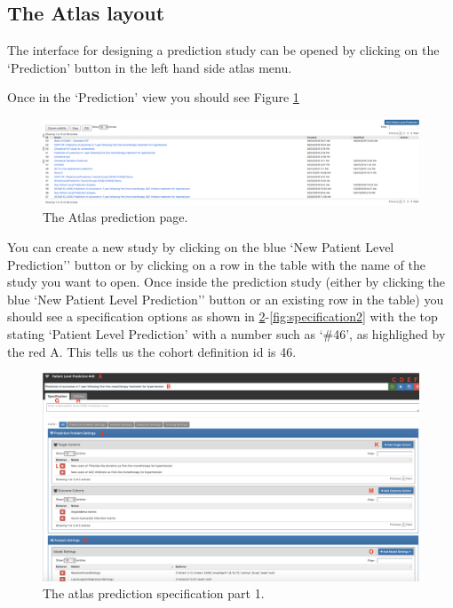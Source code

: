 \documentclass[11pt]{book}
\theoremstyle{definition}
\theoremstyle{definition}
\theoremstyle{definition}
\theoremstyle{remark}
\begin{document}
\hypertarget{the-atlas-layout}{%
\subsection{The Atlas layout}\label{the-atlas-layout}}

The interface for designing a prediction study can be opened by clicking on the `Prediction' button in the left hand side atlas menu.

Once in the `Prediction' view you should see Figure \ref{fig:figure2b}

\begin{figure}
\includegraphics[width=1\linewidth]{images/PatientLevelPrediction/atlasImplementation/prediction_page} \caption{The Atlas prediction page.}\label{fig:figure2b}
\end{figure}

You can create a new study by clicking on the blue `New Patient Level Prediction'' button or by clicking on a row in the table with the name of the study you want to open. Once inside the prediction study (either by clicking the blue `New Patient Level Prediction'' button or an existing row in the table) you should see a specification options as shown in \ref{fig:specification1}-\ref{fig:specification2} with the top stating `Patient Level Prediction' with a number such as `\#46', as highlighed by the red A. This tells us the cohort definition id is 46.

\begin{figure}
\includegraphics[width=1\linewidth]{images/PatientLevelPrediction/atlasImplementation/specification_p1} \caption{The atlas prediction specification part 1.}\label{fig:specification1}
\end{figure}
\end{document}
